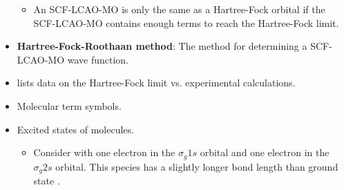 \documentclass[../notes.tex]{subfiles}
\begin{document}
\begin{itemize}
\begin{itemize}
        \item An SCF-LCAO-MO is only the same as a Hartree-Fock orbital if the SCF-LCAO-MO contains enough terms to reach the Hartree-Fock limit.
    \end{itemize}
    \item \textbf{Hartree-Fock-Roothaan method}: The method for determining a SCF-LCAO-MO wave function.
    \item \textcite{bib:McQuarrieSimon} lists data on the Hartree-Fock limit vs. experimental calculations.
    \item Molecular term symbols.
    \item Excited states of molecules.
    \begin{itemize}
        \item Consider  with one electron in the $\sigma_g1s$ orbital and one electron in the $\sigma_g2s$ orbital. This species has a slightly longer bond length than ground state .
    \end{itemize}
\end{itemize}
\end{document}
